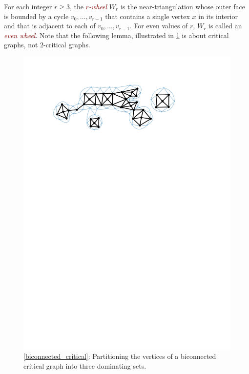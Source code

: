 \documentclass{article}
\newcommand{\defin}[1]{\emph{\textcolor{Maroon}{#1}}}
\theoremstyle{definition}
\begin{document}
For each integer $r\ge 3$, the \defin{$r$-wheel} $W_r$ is the near-triangulation whose outer face is bounded by a cycle $v_0,\ldots,v_{r-1}$ that contains a single vertex $x$ in its interior and that is adjacent to each of $v_0,\ldots,v_{r-1}$.  For even values of $r$, $W_r$ is called an \defin{even wheel}. Note that the following lemma, illustrated in \cref{biconnected_critical_colouring} is about critical graphs, not $2$-critical graphs.

\begin{figure}
  \centering
  \includegraphics[page=7,trim={0 55 0 10},clip]{figs/two_critical}
  \caption{\cref{biconnected_critical}: Partitioning the vertices of a biconnected critical graph into three dominating sets.}
  \label{biconnected_critical_colouring}
\end{figure}
\end{document}

